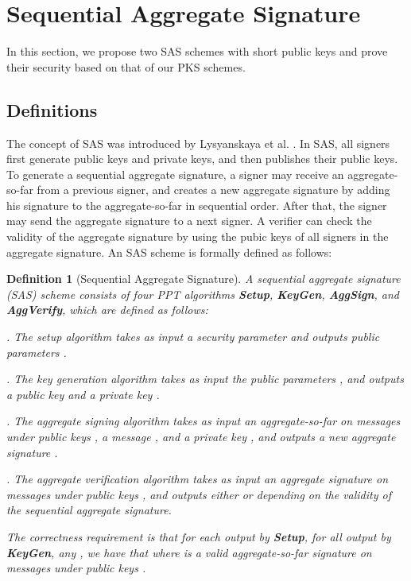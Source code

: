 \documentclass[11pt,letterpaper]{article}
\newtheorem{definition}[theorem]{Definition}
\newcommand{\tb}[1]{\textbf{#1}}
\begin{document}
\section{Sequential Aggregate Signature} \label{sec:sas}

In this section, we propose two SAS schemes with short public keys and prove
their security based on that of our PKS schemes.

\subsection{Definitions} \label{sec:sas-def}

The concept of SAS was introduced by Lysyanskaya et al.
\cite{LysyanskayaMRS04}. In SAS, all signers first generate public keys and
private keys, and then publishes their public keys. To generate a sequential
aggregate signature, a signer may receive an aggregate-so-far from a previous
signer, and creates a new aggregate signature by adding his signature to the
aggregate-so-far in sequential order. After that, the signer may send the
aggregate signature to a next signer. A verifier can check the validity of
the aggregate signature by using the pubic keys of all signers in the
aggregate signature. An SAS scheme is formally defined as follows:

\begin{definition}[Sequential Aggregate Signature]
A sequential aggregate signature (SAS) scheme consists of four PPT algorithms
\tb{Setup}, \tb{KeyGen}, \tb{AggSign}, and \tb{AggVerify}, which are defined
as follows:
\begin{description}
\item . The setup algorithm takes as input a
    security parameter  and outputs public parameters .

\item . The key generation algorithm takes as input the
    public parameters , and outputs a public key  and a private key
    .

\item . The aggregate
    signing algorithm takes as input an aggregate-so-far  on messages
     under public keys , a message , and a private key , and outputs a
    new aggregate signature .

\item . The aggregate verification
    algorithm takes as input an aggregate signature  on messages
     under public keys , and outputs either  or  depending on the validity
    of the sequential aggregate signature.
\end{description}
The correctness requirement is that for each  output by \tb{Setup}, for
all  output by \tb{KeyGen}, any , we have that  where  is a valid aggregate-so-far signature on
messages  under public keys .
\end{definition}
\end{document}
